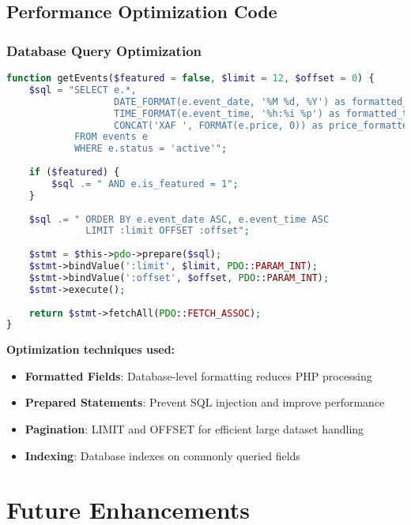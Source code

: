 \documentclass[12pt,a4paper]{article}
\begin{document}
\subsection{Performance Optimization Code}

\subsubsection{Database Query Optimization}
\begin{lstlisting}[language=php, caption=Optimized Event Retrieval]
function getEvents($featured = false, $limit = 12, $offset = 0) {
    $sql = "SELECT e.*, 
                   DATE_FORMAT(e.event_date, '%M %d, %Y') as formatted_date,
                   TIME_FORMAT(e.event_time, '%h:%i %p') as formatted_time,
                   CONCAT('XAF ', FORMAT(e.price, 0)) as price_formatted
            FROM events e 
            WHERE e.status = 'active'";
    
    if ($featured) {
        $sql .= " AND e.is_featured = 1";
    }
    
    $sql .= " ORDER BY e.event_date ASC, e.event_time ASC 
              LIMIT :limit OFFSET :offset";
    
    $stmt = $this->pdo->prepare($sql);
    $stmt->bindValue(':limit', $limit, PDO::PARAM_INT);
    $stmt->bindValue(':offset', $offset, PDO::PARAM_INT);
    $stmt->execute();
    
    return $stmt->fetchAll(PDO::FETCH_ASSOC);
}
\end{lstlisting}

\textbf{Optimization techniques used:}
\begin{itemize}
    \item \textbf{Formatted Fields}: Database-level formatting reduces PHP processing
    \item \textbf{Prepared Statements}: Prevent SQL injection and improve performance
    \item \textbf{Pagination}: LIMIT and OFFSET for efficient large dataset handling
    \item \textbf{Indexing}: Database indexes on commonly queried fields
\end{itemize}

\section{Future Enhancements}
\end{document}
